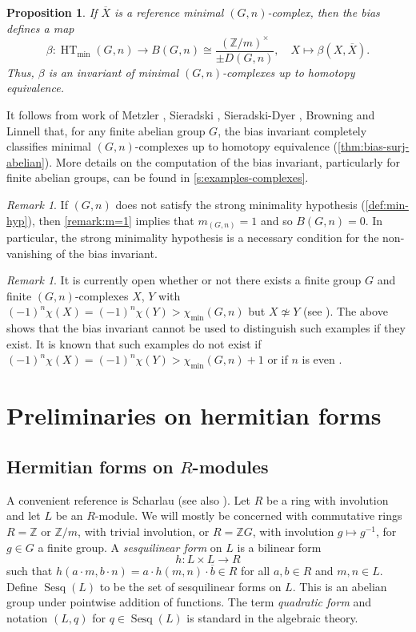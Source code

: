 \documentclass[11pt,a4paper,leqno]{amsart}
\newtheorem{proposition}[theorem]{Proposition}
\theoremstyle{definition}
\theoremstyle{remark}
\newtheorem{remark}[theorem]{Remark}
\newcommand{\cy}[1]{\Z/{#1}}
\newcommand{\Z}{\mathbb{Z}}
\newcommand{\ol}{\overline}
\DeclareMathOperator{\Sesq}{Sesq}
\DeclareMathOperator{\HT}{HT}
\newcommand{\bZ}{\mathbb Z}
\newcommand{\ZG}{\bZ G}
\begin{document}
\begin{proposition}
If $\ol{X}$ is a reference minimal $(G,n)$-complex, then the bias defines a map
\[ \beta\colon\HT_{\min}(G,n) \to B(G,n) \cong \frac{(\Z/m)^\times}{\pm D(G,n)} , \quad X \mapsto \beta(X,\ol{X}). \]
Thus, $\beta$ is an invariant of minimal $(G,n)$-complexes up to homotopy equivalence.
\end{proposition}

It follows from work of Metzler \cite{Metzler:1976}, Sieradski \cite{Sieradski:1977}, Sieradski-Dyer \cite{Sieradski:1979}, Browning \cite{Browning:1979c,Browning:1979} and Linnell \cite{Linnell:1993} that, for any finite abelian group $G$, the bias invariant completely classifies minimal $(G,n)$-complexes up to homotopy equivalence (\cref{thm:bias-surj-abelian}).
More details on the computation of the bias invariant, particularly for finite abelian groups, can be found in \cref{s:examples-complexes}.

\begin{remark} \label{remark:bias-minimality}
If $(G,n)$ does not satisfy the strong minimality hypothesis (\cref{def:min-hyp}), then \cref{remark:m=1} implies that $m_{(G,n)}=1$ and so $B(G,n)=0$. In particular, the strong minimality hypothesis is a necessary condition for the non-vanishing of the bias invariant.
\end{remark}

\begin{remark}
It is currently open whether or not there exists a finite group $G$ and finite $(G,n)$-complexes $X$, $Y$ with $(-1)^n\chi(X) = (-1)^n\chi(Y) > \chi_{\min}(G,n)$ but $X \not \simeq Y$ (see \cite[Question 7.4]{Ni20-I}). The above shows that the bias invariant cannot be used to distinguish such examples if they exist.
It is known that such examples do not exist if $(-1)^n\chi(X) = (-1)^n\chi(Y) > \chi_{\min}(G,n)+1$ \cite{Dy78,Wi73} or if $n$ is even \cite{Browning:1979}.
\end{remark}

\section{Preliminaries on hermitian forms} 
\label{s:forms}

\subsection{Hermitian forms on $R$-modules}

A convenient reference is Scharlau \cite{Scharlau:1985} (see also \cite[Section 6.2]{Teichner:1992}). 
Let $R$ be a ring with involution and let $L$ be an $R$-module. We will mostly be concerned with  commutative rings $R=  \bZ$ or $\cy m$, with trivial involution,  or $R  =\ZG$, with involution $g \mapsto g^{-1}$, for $g \in G$ a finite group.
A \textit{sesquilinear form} on $L$ is a bilinear form 
\[ h\colon L \times L \to R\] 
such that $h(a \cdot m, b \cdot n) = a \cdot h(m,n) \cdot \ol{b} \in R$ for all $a,b \in R$ and $m,n\in L$. Define $\Sesq(L)$ to be the set of sesquilinear forms on $L$.
This is an abelian group under pointwise addition of functions. The term  \textit{quadratic form}  and notation $(L,q)$ for $q \in \Sesq(L)$ is standard in the algebraic theory. 
\end{document}
